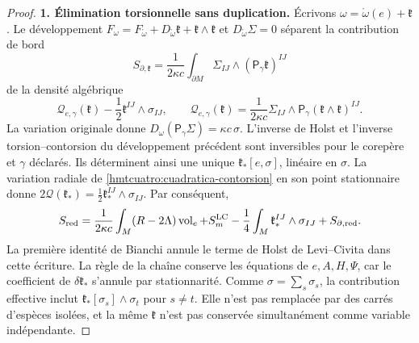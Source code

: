 \begin{proof}
\par\medskip\noindent\textbf{1. Élimination torsionnelle sans duplication.}\quad
Écrivons \(\omega=\mathring\omega(e)+\mathfrak k\). Le développement \(F_\omega=F_{\mathring\omega}
+D_{\mathring\omega}\mathfrak k+\mathfrak k\wedge\mathfrak k\) et \(D_{\mathring\omega}\Sigma=0\) séparent la contribution de bord
\[
 S_{\partial,\mathfrak k}
 =\frac1{2\kappa c}\int_{\partial M}
                  \Sigma_{IJ}\wedge(\mathsf P_\gamma\mathfrak k)^{IJ}
\]
de la densité algébrique
\begin{equation}
 \mathcal Q_{e,\gamma}(\mathfrak k)
       -\frac12\mathfrak k^{IJ}\wedge\sigma_{IJ},\qquad
 \mathcal Q_{e,\gamma}(\mathfrak k)=\frac1{2\kappa c}
       \Sigma_{IJ}\wedge
       \mathsf P_\gamma(\mathfrak k\wedge\mathfrak k)^{IJ}.
 \label{hmtcuatro:cuadratica-contorsion}
\end{equation}
La variation originale donne \(D_\omega(\mathsf P_\gamma\Sigma)=\kappa c\,\sigma\). L’inverse de Holst et l’inverse torsion--contorsion du développement précédent sont inversibles pour le corepère et \(\gamma\) déclarés. Ils déterminent ainsi une unique \(\mathfrak k_*[e,\sigma]\), linéaire en \(\sigma\). La variation radiale de \eqref{hmtcuatro:cuadratica-contorsion} en son point stationnaire donne \(2\mathcal Q(\mathfrak k_*)=\frac12\mathfrak k_*^{IJ}\wedge\sigma_{IJ}\). Par conséquent,
\begin{equation}
 S_{\rm red}=\frac1{2\kappa c}\int_M(R-2\Lambda)\operatorname{vol}_e
       +S_m^{\rm LC}
       -\frac14\int_M\mathfrak k_*^{IJ}\wedge\sigma_{IJ}
       +S_{\partial,\rm red}.
 \label{hmtcuatro:accion-reducida}
\end{equation}
La première identité de Bianchi annule le terme de Holst de Levi--Civita dans cette écriture. La règle de la chaîne conserve les équations de \(e,A,H,\Psi\), car le coefficient de \(\delta\mathfrak k_*\) s’annule par stationnarité. Comme \(\sigma=\sum_s\sigma_s\), la contribution effective inclut \(\mathfrak k_*[\sigma_s]\wedge\sigma_t\) pour \(s\ne t\). Elle n’est pas remplacée par des carrés d’espèces isolées, et la même \(\mathfrak k\) n’est pas conservée simultanément comme variable indépendante.


\end{proof}
